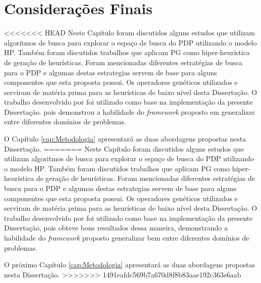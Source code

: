 







\section{Considerações Finais}
\label{TrabalhosRelacionados:Conclusão}

<<<<<<< HEAD
Neste Capítulo foram discutidos alguns estudos que utilizam algoritmos de busca para explorar o espaço de busca do PDP utilizando o modelo HP. Também foram discutidos trabalhos que aplicam PG como hiper-heurística de geração de heurísticas. Foram mencionadas diferentes estratégias de busca para o PDP e algumas destas estrategias servem de base para alguns componentes que esta proposta possui. Os operadores genéticos utilizados \cite{custodio2014multiple} e \cite{lin2011protein} serviram de matéria prima para as heurísticas de baixo nível desta Dissertação. O trabalho desenvolvido por \cite{sabar2015automatic} foi utilizado como base na implementação da presente Dissertação. 
pois demonstrou a habilidade do \textit{framework} proposto em generalizar entre diferentes domínios de problemas.

O Capítulo \ref{cap:Metodologia} apresentará as duas abordagens propostas nesta Dissertação. 
=======
Neste Capítulo foram discutidos alguns estudos que utilizam algoritmos de busca para explorar o espaço de busca do PDP utilizando o modelo HP. Também foram discutidos trabalhos que aplicam PG como hiper-heurística de geração de heurísticas. Foram mencionadas diferentes estratégias de busca para o PDP e algumas destas estrategias servem de base para alguns componentes que esta proposta possui. Os operadores genéticos utilizados \cite{custodio2014multiple} e \cite{lin2011protein} serviram de matéria prima para as heurísticas de baixo nível desta Dissertação. O trabalho desenvolvido por \cite{sabar2015automatic} foi utilizado como base na implementação da presente Dissertação, pois obteve bons resultados dessa maneira, demonstrando a habilidade do \textit{framework} proposto generalizar bem entre diferentes domínios de problemas.

O próximo Capítulo \ref{cap:Metodologia} apresentará as duas abordagens propostas nesta Dissertação. 
>>>>>>> 1491eafdc569b7a670d8f8b83aae192c363e6aab
